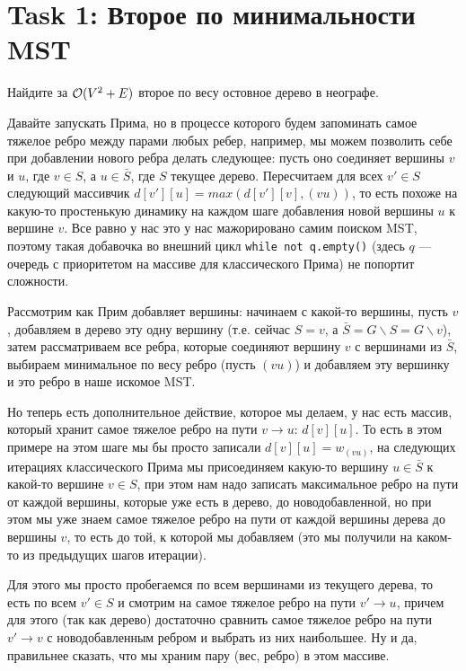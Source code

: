 \section{Task 1: Второе по минимальности MST}
\begin{task}
    Найдите за $\mathcal{O}(V^2 + E)$ второе по весу остовное дерево в неографе.
\end{task}

\begin{solution}
    Давайте запускать Прима, но в процессе которого будем запоминать самое тяжелое ребро между парами любых ребер, например, мы можем позволить себе при добавлении нового ребра делать следующее: пусть оно соединяет вершины $v$ и $u$, где $v \in S$, а $u \in \bar{S}$, где $S$ текущее дерево.
    Пересчитаем для всех $v'\in S$ следующий массивчик $d[v'][u] = max(d[v'][v], (vu))$, то есть похоже на какую-то простенькую динамику на каждом шаге добавления новой вершины $u$ к вершине $v$.
    Все равно у нас это у нас мажорировано самим поиском MST, поэтому такая добавочка во внешний цикл \texttt{while not q.empty()} (здесь $q$ --- очередь с приоритетом на массиве для классического Прима) не попортит сложности.
    
    \begin{upd}
        Рассмотрим как Прим добавляет вершины: начинаем с какой-то вершины, пусть $v$, добавляем в дерево эту одну вершину (т.е. сейчас $S = v$, а $\bar{S} = G \smallsetminus S = G \smallsetminus v$), затем рассматриваем все ребра, которые соединяют вершину $v$ с вершинами из $\bar{S}$, выбираем минимальное по весу ребро (пусть $(vu)$) и добавляем эту вершинку и это ребро в наше искомое MST.


        Но теперь есть дополнительное действие, которое мы делаем, у нас есть массив, который хранит самое тяжелое ребро на пути $v \rightarrow u$: $d[v][u]$.
        То есть в этом примере на этом шаге мы бы просто записали $d[v][u] = w_{(vu)}$, на следующих итерациях классического Прима мы присоединяем какую-то вершину $u \in \bar{S}$ к какой-то вершине $v \in S$, при этом нам надо записать максимальное ребро на пути от каждой вершины, которые уже есть в дерево, до новодобавленной, но при этом мы уже знаем самое тяжелое ребро на пути от каждой вершины дерева до вершины $v$, то есть до той, к которой мы добавляем (это мы получили на каком-то из предыдущих шагов итерации).

        Для этого мы просто пробегаемся по всем вершинами из текущего дерева, то есть по всем $v' \in S$ и смотрим на самое тяжелое ребро на пути $v' \rightarrow u$, причем для этого (так как дерево) достаточно сравнить самое тяжелое ребро на пути $v' \rightarrow v$ с новодобавленным ребром и выбрать из них наибольшее. Ну и да, правильнее сказать, что мы храним пару (вес, ребро) в этом массиве.


\end{upd}
\end{solution}
